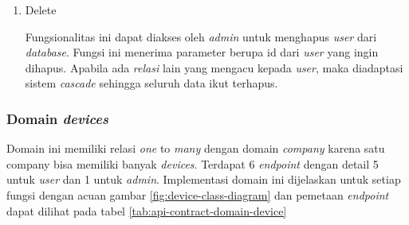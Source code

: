 \begin{enumerate}
          Fungsionalitas ini menerima masukan berupa json dengan \textit{field} \textit{name}, \textit{email}, \textit{password}, serta \textit{company\textunderscore id} dari \textit{requester}. Seluruh \textit{field} tersebut digunakan untuk membuat objek user pada \textit{database}. Pada fungsi ini dilakukan pengecekan apakah \textit{email} valid dan \textit{unique}. Selain itu ada validasi \textit{company\textunderscore id} agar dipastikan bahwa \textit{user} benar terdaftar ke \textit{company} yang sesuai. Apabila validasi tidak berhasil maka dikeluarkan pesan error, namun jika semua berhasil dilewati maka dikembalikan \textit{response} berupa \textit{user} yang telah dibuat pada \textit{database}.

    \item Delete

          Fungsionalitas ini dapat diakses oleh \textit{admin} untuk menghapus \textit{user} dari \textit{database}. Fungsi ini menerima parameter berupa id dari \textit{user} yang ingin dihapus. Apabila ada \textit{relasi} lain yang mengacu kepada \textit{user}, maka diadaptasi sistem \textit{cascade} sehingga seluruh data ikut terhapus.

\end{enumerate}

\subsubsection{Domain \textit{devices}}

Domain ini memiliki relasi \textit{one} to \textit{many} dengan domain \textit{company} karena satu company bisa memiliki banyak \textit{devices}. Terdapat 6 \textit{endpoint} dengan detail 5 untuk \textit{user} dan 1 untuk \textit{admin}. Implementasi domain ini dijelaskan untuk setiap fungsi dengan acuan gambar \ref{fig:device-class-diagram} dan pemetaan \textit{endpoint} dapat dilihat pada tabel \ref{tab:api-contract-domain-device}

